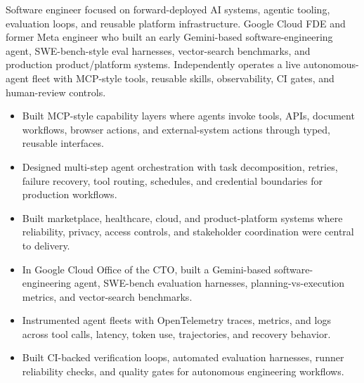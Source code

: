 


Software engineer focused on forward-deployed AI systems, agentic tooling, evaluation loops, and reusable platform infrastructure. Google Cloud FDE and former Meta engineer who built an early Gemini-based software-engineering agent, SWE-bench-style eval harnesses, vector-search benchmarks, and production product/platform systems. Independently operates a live autonomous-agent fleet with MCP-style tools, reusable skills, observability, CI gates, and human-review controls.
\begin{itemize}
  \item Built MCP-style capability layers where agents invoke tools, APIs, document workflows, browser actions, and external-system actions through typed, reusable interfaces.
  \item Designed multi-step agent orchestration with task decomposition, retries, failure recovery, tool routing, schedules, and credential boundaries for production workflows.
  \item Built marketplace, healthcare, cloud, and product-platform systems where reliability, privacy, access controls, and stakeholder coordination were central to delivery.
\end{itemize}
\begin{itemize}
  \item In Google Cloud Office of the CTO, built a Gemini-based software-engineering agent, SWE-bench evaluation harnesses, planning-vs-execution metrics, and vector-search benchmarks.
  \item Instrumented agent fleets with OpenTelemetry traces, metrics, and logs across tool calls, latency, token use, trajectories, and recovery behavior.
  \item Built CI-backed verification loops, automated evaluation harnesses, runner reliability checks, and quality gates for autonomous engineering workflows.
\end{itemize}





